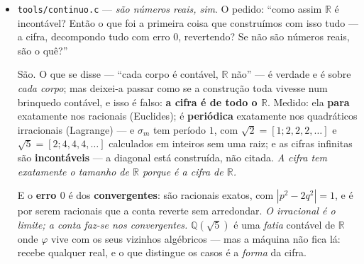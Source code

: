 \documentclass[11pt]{article}
\newcommand{\code}[1]{\texttt{\small #1}}
\newcommand{\R}{\mathbb R}
\newcommand{\Q}{\mathbb Q}
\theoremstyle{plain}
\theoremstyle{remark}
\begin{document}
\begin{itemize}
\textbf{O isomorfismo cónico $\cong$ elíptico:} a bijeção é a \emph{identidade no} $\lambda$, e
preserva o compor e a ordem. Não é semelhança --- é o \emph{mesmo objeto}: ambos são
$(\Q_+)^{n-1}$ com o compor a multiplicar. \emph{A figura era o dicionário.}

\textbf{E ordenados como os reais}, num sentido exato: a ordem é total, \textbf{densa} (entre dois
há sempre um terceiro --- exibido, a média) e \textbf{sem extremos}. Uma ordem total densa contável
sem extremos é isomorfa à de $\Q$ (Cantor), e $\R$ é o seu \textbf{completamento}. O que
\emph{não} se afirma é que \emph{cada corpo algébrico} seja isomorfo a $\R$ --- $\R$ é incontável
(\code{reais.c} §R3): \emph{a ordem é a mesma; o corpo é que não}. Mas isso é sobre cada corpo, um
de cada vez --- \textbf{não} sobre o que a construção alcança, e o item seguinte corrige o que se
deixei obscuro.

E aqui fecha o que se vinha a errar desde a manhã: procurava-se saber se cada figura ``era
ordenável'', como se fosse propriedade dela. \textbf{A ordem não está na figura --- está no
parâmetro da deformação, e é sempre o mesmo.}
\item \code{tools/continuo.c} --- \emph{são números reais, sim}. O pedido: ``como assim $\R$ é
incontável? Então o que foi a primeira coisa que construímos com isso tudo --- a cifra, decompondo
tudo com erro $0$, revertendo? Se não são números reais, são o quê?''

São. O que se disse --- ``cada corpo é contável, $\R$ não'' --- é verdade e é sobre \emph{cada
corpo}; mas deixei-a passar como se a construção toda vivesse num brinquedo contável, e isso é
falso: \textbf{a cifra é de todo o $\R$}. Medido: ela \textbf{para} exatamente nos racionais
(Euclides); é \textbf{periódica} exatamente nos quadráticos irracionais (Lagrange) --- e $\sigma_m$
tem período $1$, com $\sqrt2 = [1;2,2,2,\dots]$ e $\sqrt5 = [2;4,4,4,\dots]$ calculados em inteiros
sem uma raiz; e as cifras infinitas são \textbf{incontáveis} --- a diagonal está construída, não
citada. \emph{A cifra tem exatamente o tamanho de $\R$ porque é a cifra de $\R$.}

E o \textbf{erro $0$} é dos \textbf{convergentes}: são racionais exatos, com $|p^2-2q^2| = 1$, e é
por serem racionais que a conta reverte sem arredondar. \emph{O irracional é o limite; a conta
faz-se nos convergentes.} $\Q(\sqrt5)$ é uma \emph{fatia} contável de $\R$ onde $\varphi$ vive com
os seus vizinhos algébricos --- mas a máquina não fica lá: recebe qualquer real, e o que distingue
os casos é a \emph{forma} da cifra.


\end{itemize}
\end{document}
